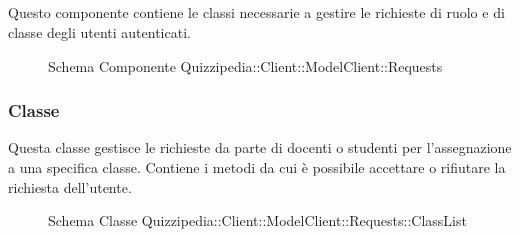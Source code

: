 \subsection{}
Questo componente contiene le classi necessarie a gestire le richieste di ruolo e di classe degli utenti autenticati.
\begin{figure}[H]
\centering
\noindent{}
\caption[Schema Componente Quizzipedia::Client::ModelClient::Requests]{Schema Componente Quizzipedia::Client::ModelClient::Requests}
\end{figure}
\subsubsection{Classe }
Questa classe gestisce le richieste da parte di docenti o studenti per l'assegnazione a una specifica classe. Contiene i metodi da cui è possibile accettare o rifiutare la richiesta dell'utente.
\begin{figure}[H]
\centering
\noindent{}
\caption[Schema Classe ClassList]{Schema Classe Quizzipedia::Client::ModelClient::Requests::ClassList}
\end{figure}
